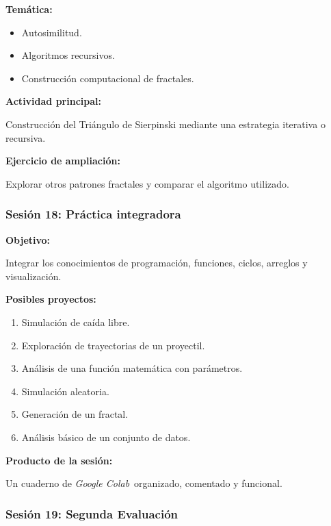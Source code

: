 \documentclass[12pt,letterpaper]{article}
\newcommand{\colab}{\textit{Google Colab}}
\begin{document}
\textbf{Temática:}
\begin{itemize}[noitemsep]
    \item Autosimilitud.
    \item Algoritmos recursivos.
    \item Construcción computacional de fractales.
\end{itemize}

\textbf{Actividad principal:}

Construcción del Triángulo de Sierpinski mediante una estrategia iterativa o recursiva.

\textbf{Ejercicio de ampliación:}

Explorar otros patrones fractales y comparar el algoritmo utilizado.


\subsubsection*{Sesión 18: Práctica integradora}

\textbf{Objetivo:}

Integrar los conocimientos de programación, funciones, ciclos, arreglos y visualización.

\textbf{Posibles proyectos:}
\begin{enumerate}[noitemsep]
    \item Simulación de caída libre.
    \item Exploración de trayectorias de un proyectil.
    \item Análisis de una función matemática con parámetros.
    \item Simulación aleatoria.
    \item Generación de un fractal.
    \item Análisis básico de un conjunto de datos.
\end{enumerate}

\textbf{Producto de la sesión:}

Un cuaderno de \colab\ organizado, comentado y funcional.

\subsubsection*{Sesión 19: Segunda Evaluación}

\end{document}
